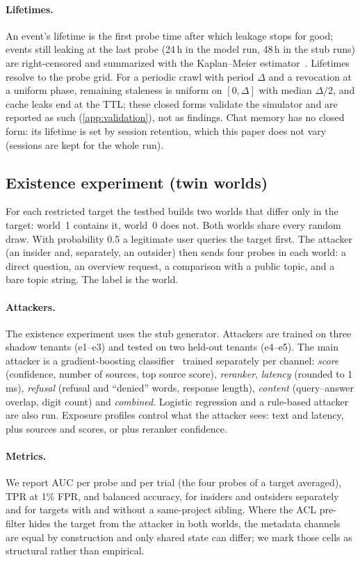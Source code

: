\paragraph{Lifetimes.}
An event's lifetime is the first probe time after which leakage stops for good; events still leaking
at the last probe (24\,h in the model run, 48\,h in the stub runs) are right-censored and summarized with the Kaplan--Meier estimator~\cite{kaplan1958nonparametric}.
Lifetimes resolve to the probe grid. For a periodic crawl with period $\Delta$ and a revocation at a
uniform phase, remaining staleness is uniform on $[0,\Delta]$ with median $\Delta/2$, and cache leaks
end at the TTL; these closed forms validate the simulator and are reported as such
(\cref{app:validation}), not as findings. Chat memory has no closed form: its lifetime is set by
session retention, which this paper does not vary (sessions are kept for the whole run).

\subsection{Existence experiment (twin worlds)}
For each restricted target the testbed builds two worlds that differ only in the target: world~1
contains it, world~0 does not. Both worlds share every random draw. With probability 0.5 a
legitimate user queries the target first. The attacker (an insider and, separately, an outsider)
then sends four probes in each world: a direct question, an overview request, a comparison with a
public topic, and a bare topic string. The label is the world.

\paragraph{Attackers.}
The existence experiment uses the stub generator. Attackers are trained on three shadow tenants
(e1--e3) and tested on two held-out tenants (e4--e5). The main attacker is a gradient-boosting
classifier~\cite{friedman2001gradient} trained separately per channel: \emph{score} (confidence,
number of sources, top source score), \emph{reranker}, \emph{latency} (rounded to 1\,ms),
\emph{refusal} (refusal and ``denied'' words, response length), \emph{content} (query--answer overlap,
digit count) and \emph{combined}. Logistic regression and a rule-based attacker are also run.
Exposure profiles control what the attacker sees: text and latency, plus sources and scores, or plus
reranker confidence.

\paragraph{Metrics.}
We report AUC per probe and per trial (the four probes of a target averaged), TPR at 1\% FPR, and
balanced accuracy, for insiders and outsiders separately and for targets with and without a
same-project sibling. Where the ACL pre-filter hides the target from the attacker in both worlds, the
metadata channels are equal by construction and only shared state can differ; we mark those cells as
structural rather than empirical.

